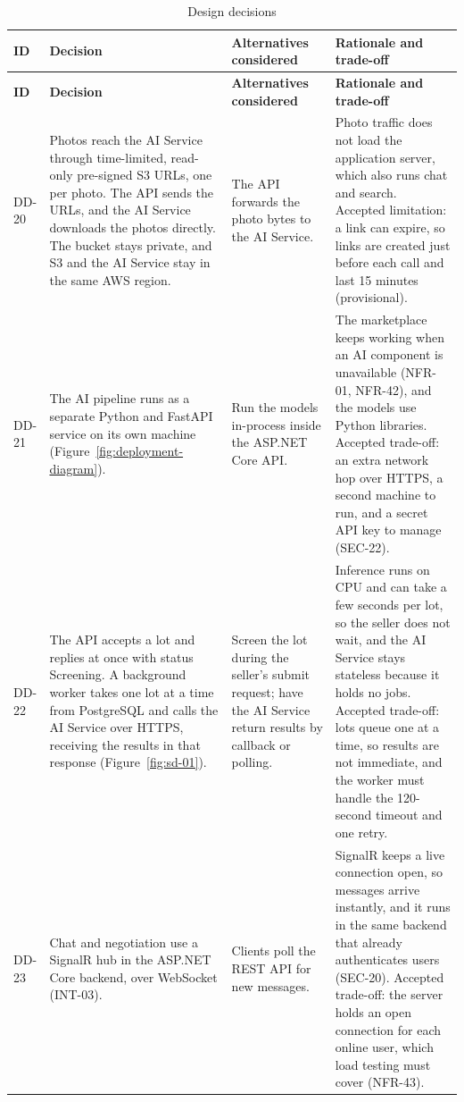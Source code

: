 {\small
\begin{longtable}{@{}>{\raggedright\arraybackslash}p{}>{\raggedright\arraybackslash}p{}>{\raggedright\arraybackslash}p{}>{\raggedright\arraybackslash}p{}@{}}
\caption{Design decisions}\label{tab:design-decisions}\\
\toprule
\textbf{ID} & \textbf{Decision} & \textbf{Alternatives considered} & \textbf{Rationale and trade-off} \\
\midrule
\endfirsthead
\toprule
\textbf{ID} & \textbf{Decision} & \textbf{Alternatives considered} & \textbf{Rationale and trade-off} \\
\midrule
\endhead

DD-20 & Photos reach the AI Service through time-limited, read-only pre-signed S3 URLs, one per photo. The API sends the URLs, and the AI Service downloads the photos directly. The bucket stays private, and S3 and the AI Service stay in the same AWS region. & The API forwards the photo bytes to the AI Service. & Photo traffic does not load the application server, which also runs chat and search. Accepted limitation: a link can expire, so links are created just before each call and last 15 minutes (provisional). \\
DD-21 & The AI pipeline runs as a separate Python and FastAPI service on its own machine (Figure~\ref{fig:deployment-diagram}). & Run the models in-process inside the ASP.NET Core API. & The marketplace keeps working when an AI component is unavailable (NFR-01, NFR-42), and the models use Python libraries. Accepted trade-off: an extra network hop over HTTPS, a second machine to run, and a secret API key to manage (SEC-22). \\
DD-22 & The API accepts a lot and replies at once with status Screening. A background worker takes one lot at a time from PostgreSQL and calls the AI Service over HTTPS, receiving the results in that response (Figure~\ref{fig:sd-01}). & Screen the lot during the seller's submit request; have the AI Service return results by callback or polling. & Inference runs on CPU and can take a few seconds per lot, so the seller does not wait, and the AI Service stays stateless because it holds no jobs. Accepted trade-off: lots queue one at a time, so results are not immediate, and the worker must handle the 120-second timeout and one retry. \\
DD-23 & Chat and negotiation use a SignalR hub in the ASP.NET Core backend, over WebSocket (INT-03). & Clients poll the REST API for new messages. & SignalR keeps a live connection open, so messages arrive instantly, and it runs in the same backend that already authenticates users (SEC-20). Accepted trade-off: the server holds an open connection for each online user, which load testing must cover (NFR-43). \\

\end{longtable}}
